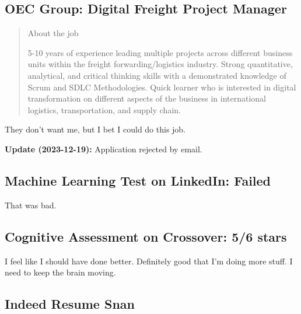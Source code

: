 \documentclass[
	letterpaper, %
	12pt, %
]{CSSullivanBusinessReport}
\begin{document}

\subsection[OEC Group]{OEC Group: Digital Freight Project Manager}

\begin{quote}
	About the job
	
    5-10 years of experience leading multiple projects across different business units within the freight forwarding/logistics industry.
    Strong quantitative, analytical, and critical thinking skills with a demonstrated knowledge of Scrum and SDLC Methodologies.
    Quick learner who is interested in digital transformation on different aspects of the business in international logistics, transportation, and supply chain.


\end{quote}

They don't want me, but I bet I could do this job. 

\textbf{Update (2023-12-19):} Application rejected by email.



\subsection[Machine Learning Test]{Machine Learning Test on LinkedIn: Failed}

That was bad. 


\subsection[Cognitive Assessment]{Cognitive Assessment on Crossover: 5/6 stars}

I feel like I should have done better. Definitely good that I'm doing more stuff. I need to keep the brain moving. 


\subsection[Indeed Resume Snan]{Indeed Resume Snan}
\end{document}
